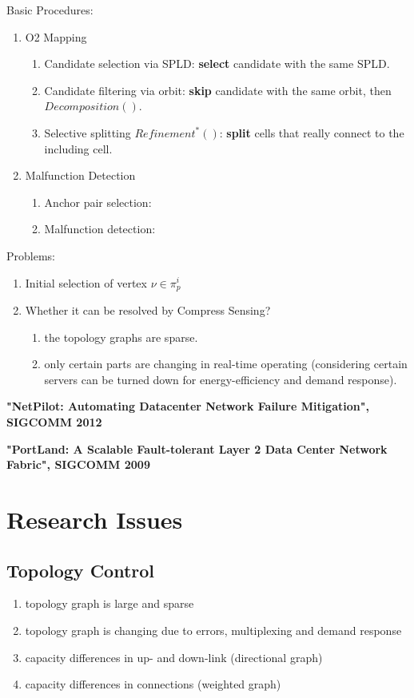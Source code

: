 \documentclass[journal,onecolumn,11pt]{IEEEtran}
\begin{document}
Basic Procedures:
\begin{enumerate}
  \item O2 Mapping
  \begin{enumerate}
    \item Candidate selection via SPLD: \textbf{select} candidate with the same SPLD.
    \item Candidate filtering via orbit: \textbf{skip} candidate with the same orbit, then $Decomposition()$.
    \item Selective splitting $Refinement^*()$: \textbf{split} cells that really connect to the including cell.
  \end{enumerate}
  \item Malfunction Detection
  \begin{enumerate}
    \item Anchor pair selection:
    \item Malfunction detection:
  \end{enumerate}
\end{enumerate}

Problems:
\begin{enumerate}
  \item Initial selection of vertex $\nu\in\pi_p^i$
  \item Whether it can be resolved by Compress Sensing?
  \begin{enumerate}
    \item the topology graphs are sparse.
    \item only certain parts are changing in real-time operating (considering certain servers can be turned down for energy-efficiency and demand response).
  \end{enumerate}
\end{enumerate}

\textbf{"NetPilot: Automating Datacenter Network Failure Mitigation", SIGCOMM 2012}

\textbf{"PortLand: A Scalable Fault-tolerant Layer 2 Data Center Network Fabric", SIGCOMM 2009}

\section{Research Issues}

\subsection{Topology Control}

\begin{enumerate}
  \item topology graph is large and sparse
  \item topology graph is changing due to errors, multiplexing and demand response
  \item capacity differences in up- and down-link (directional graph)
  \item capacity differences in connections (weighted graph)
\end{enumerate}
\end{document}
